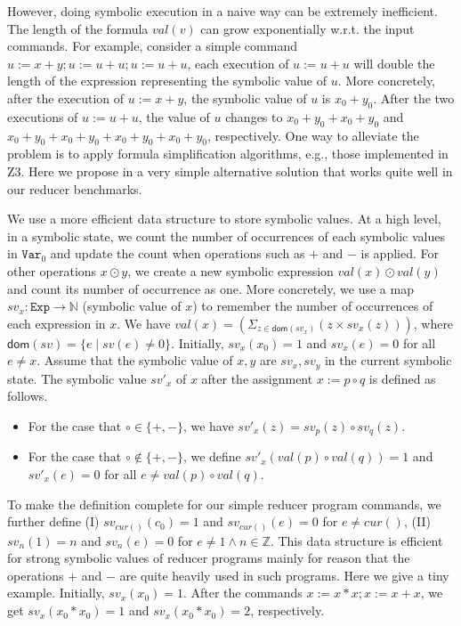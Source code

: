 \documentclass{llncs}
\newcommand{\Var}{\mathtt{Var}}
\newcommand{\Exp}{\mathtt{Exp}}
\newcommand{\cur}{cur()}
\newcommand{\dom}[1]{\mathsf{dom}(#1)}
\newcommand{\Z}{\mathbb{Z}}
\begin{document}
{However, doing symbolic execution in a naive way can be extremely inefficient.
The length of the formula $val(v)$ can grow exponentially w.r.t. the input commands. For example, consider a simple command $u:=x+y;u:=u+u;u:=u+u$, each execution of $u:= u+ u$ will double the length of the expression representing the symbolic value of $u$. More concretely, after the execution of $u:=x+y$, the symbolic value of $u$ is $x_0+y_0$. After the two executions of $u:=u+u$, the value of $u$ changes to $x_0+y_0+x_0+y_0$ and $x_0+y_0+x_0+y_0+x_0+y_0+x_0+y_0$, respectively. One way to alleviate the problem is to apply formula simplification algorithms, e.g., those implemented in Z3.
Here we propose in a very simple alternative solution that works quite well in our reducer benchmarks.

We use a more efficient data structure to store symbolic values. At a high level, in a symbolic state, we count the number of occurrences of each symbolic values in $\Var_0$ and update the count when operations such as $+$ and $-$ is applied. For other operations $x\odot y$, we create a new symbolic expression $val(x) \odot val(y)$ and count its number of occurrence as one.
More concretely, we use a map $sv_x:\Exp\rightarrow \mathbb{N}$ (symbolic value of $x$) to remember the number of occurrences of each expression in $x$. We have $val(x)= (\Sigma_{z\in \dom{sv_x}} (z\times sv_x(z)) )$, where $\dom{sv}=\{e\mid sv(e)\neq 0\}$.
Initially, $sv_x(x_0) = 1$ and $sv_x (e) =0$ for all $e\neq x$. Assume that the symbolic value of $x,y$ are $sv_x,sv_y$ in the current symbolic state. The symbolic value $sv'_x$ of $x$ after the assignment $x:=p\circ q$ is defined as follows.

\begin{itemize}
	\item For the case that $\circ \in\{+,-\}$, we have $sv'_x(z) = sv_p(z)\circ  sv_q(z)$.
	\item For the case that $\circ \notin\{+,-\}$, we define $sv'_x(val(p) \circ val(q)) =1$ and $sv'_x(e) = 0$ for all $e\neq val(p) \circ val(q)$.
\end{itemize}
To make the definition complete for our simple reducer program commands, we further define (I) $sv_{\cur}(c_0) =1$ and $sv_{\cur}(e)=0$ for $e\neq \cur$, (II) $sv_{n}(1) =n$ and $sv_{n}(e)=0$ for $e\neq 1 \wedge n\in \Z$.
This data structure is efficient for strong symbolic values of reducer programs mainly for reason that the operations $+$ and $-$ are quite heavily used in such programs.
Here we give a tiny example. Initially, $sv_x(x_0)=1$. After the commands $x:=x*x;x:=x+x$, we get $sv_x(x_0*x_0)=1$ and $sv_x(x_0*x_0)=2$, respectively.}
\end{document}
